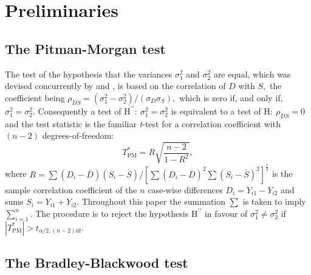 \section{Preliminaries}

\subsection{The Pitman-Morgan test}

The test of the hypothesis that the variances $\sigma^2_1$ and $\sigma^2_2$ are equal, which was devised concurrently by \cite{Pit39} and \cite{Morgan39}, is based on the correlation of $D$ with $S,$ the coefficient being $\rho_{DS} = (\sigma^2_1 - \sigma^2_2) / (\sigma_D \sigma_S ),$ which is zero if, and only if, $\sigma^2_1 = \sigma^2_2.$ Consequently a test of $\textrm{H}^{\prime\prime}\colon\ \sigma^2_1 = \sigma^2_2$ is equivalent to a test of $\textrm{H}\colon\ \rho_{DS}=0$ and the test statistic is the familiar {\it t}-test for a correlation coefficient with $(n-2)$ degrees-of-freedom:  
\[
T^*_\mathrm{PM} = R \sqrt{ \frac{n-2}{1-R^2} },
\]
where $R =  \sum (D_i-\bar{D})(S_i-\bar{S}) / [ \sum(D_i-\bar{D})^2 \sum (S_i-\bar{S})^2 ]^{\frac{1}{2}} $ 
is the sample correlation coefficient of the $n$ case-wise differences $D_i = Y_{i1} - Y_{i2}$ and sums $S_i = Y_{i1} + Y_{i2}.$ Throughout this paper the summation $\sum$ is taken to imply $\sum_{i=1}^n.$  The procedure is to reject the hypothesis $\textrm{H}^{\prime\prime}$ in favour of $\sigma^2_1\neq\sigma^2_2$ if $|T^*_\mathrm{PM}| >  t_{\alpha/2,(n-2)\textrm{df}}.$ 

\subsection{The Bradley-Blackwood test}

